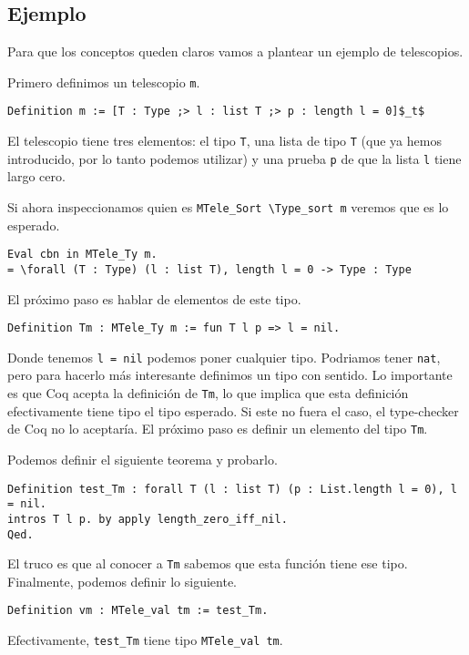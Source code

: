 \subsection{Ejemplo}

Para que los conceptos queden claros vamos a plantear un ejemplo de telescopios.

Primero definimos un telescopio \lstinline{m}.

\begin{lstlisting}
Definition m := [T : Type ;> l : list T ;> p : length l = 0]$_t$
\end{lstlisting}

El telescopio tiene tres elementos: el tipo \lstinline{T}, una lista de tipo \lstinline{T} (que ya hemos introducido, por lo tanto podemos utilizar) y una prueba \lstinline{p} de que la lista \lstinline{l} tiene largo cero.

Si ahora inspeccionamos quien es \lstinline{MTele_Sort \Type_sort m} veremos que es lo esperado.

\begin{lstlisting}
Eval cbn in MTele_Ty m.
= \forall (T : Type) (l : list T), length l = 0 -> Type : Type
\end{lstlisting}

El próximo paso es hablar de elementos de este tipo.

\begin{lstlisting}
Definition Tm : MTele_Ty m := fun T l p => l = nil.
\end{lstlisting}

Donde tenemos \lstinline{l = nil} podemos poner cualquier tipo.
Podriamos tener \lstinline{nat}, pero para hacerlo más interesante definimos un tipo con sentido.
Lo importante es que Coq acepta la definición de \lstinline{Tm}, lo que implica que esta definición efectivamente tiene tipo el tipo esperado.
Si este no fuera el caso, el type-checker de Coq no lo aceptaría.
El próximo paso es definir un elemento del tipo \lstinline{Tm}.

Podemos definir el siguiente teorema y probarlo.

\begin{lstlisting}
Definition test_Tm : forall T (l : list T) (p : List.length l = 0), l = nil.
intros T l p. by apply length_zero_iff_nil.
Qed.
\end{lstlisting}

El truco es que al conocer a \lstinline{Tm} sabemos que esta función tiene ese tipo.
Finalmente, podemos definir lo siguiente.

\begin{lstlisting}
Definition vm : MTele_val tm := test_Tm.
\end{lstlisting}

Efectivamente, \lstinline{test_Tm} tiene tipo \lstinline{MTele_val tm}.
